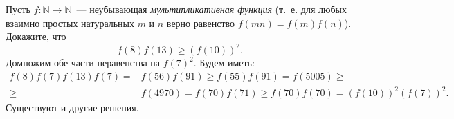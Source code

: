 \problem{}
Пусть $f \colon \mathbb{N} \to \mathbb{N}$~---
неубывающая \emph{мультипликативная функция}
(т.~е. для любых взаимно простых натуральных $m$ и $n$ верно равенство
$f(m n) = f(m) f(n)$).
Докажите, что
\[
    f(8) f(13) \geq (f(10))^2
.\]
\solution
Домножим обе части неравенства на $f(7)^2$.
Будем иметь:
\begin{align*}
    f(8) f(7) f(13) f(7)
={}&
    f(56) f(91)
\geq
    f(55) f(91) = f(5005)
\geq\\\geq{}&
    f(4970) = f(70) f(71)
\geq
    f(70) f(70) = (f(10))^2 (f(7))^2.
\end{align*}
Существуют и другие решения.
\endproblem
